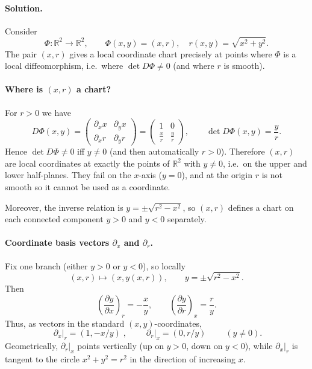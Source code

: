 \documentclass[12pt,a4paper]{article}
\theoremstyle{plain}
\theoremstyle{definition}      %
\begin{document}
\paragraph{\textbf{Solution.}}
Consider
\[
\Phi:\mathbb{R}^2\to \mathbb{R}^2,\qquad \Phi(x,y)=(x,r),\quad r(x,y)=\sqrt{x^2+y^2}.
\]
The pair $(x,r)$ gives a local coordinate chart precisely at points where $\Phi$ is a local diffeomorphism,
i.e.\ where $\det D\Phi\neq 0$ (and where $r$ is smooth).

\paragraph{Where is $(x,r)$ a chart?}
For $r>0$ we have
\[
D\Phi(x,y)=
\begin{pmatrix}
	\partial_x x & \partial_y x\\[2pt]
	\partial_x r & \partial_y r
\end{pmatrix}
=
\begin{pmatrix}
	1 & 0\\[2pt]
	\frac{x}{r} & \frac{y}{r}
\end{pmatrix},
\qquad
\det D\Phi(x,y)=\frac{y}{r}.
\]
Hence $\det D\Phi\neq 0$ iff $y\neq 0$ (and then automatically $r>0$). Therefore $(x,r)$ are local
coordinates at exactly the points of $\mathbb{R}^2$ with $y\neq 0$, i.e.\ on the upper and lower half-planes.
They fail on the $x$-axis ($y=0$), and at the origin $r$ is not smooth so it cannot be used as a coordinate.

Moreover, the inverse relation is $y=\pm\sqrt{r^2-x^2}$, so $(x,r)$ defines a chart on each connected component
$y>0$ and $y<0$ separately.

\paragraph{Coordinate basis vectors $\partial_x$ and $\partial_r$.}
Fix one branch (either $y>0$ or $y<0$), so locally
\[
(x,r)\longmapsto (x,y(x,r)),\qquad y=\pm\sqrt{r^2-x^2}.
\]
Then
\[
\left(\frac{\partial y}{\partial x}\right)_{r}=-\frac{x}{y},
\qquad
\left(\frac{\partial y}{\partial r}\right)_{x}=\frac{r}{y}.
\]
Thus, as vectors in the standard $(x,y)$-coordinates,
\[
\boxed{\;\partial_x\Big|_{r}=(1,-x/y)\;},\qquad
\boxed{\;\partial_r\Big|_{x}=(0,r/y)\;}
\qquad (y\neq 0).
\]
Geometrically, $\partial_r|_x$ points vertically (up on $y>0$, down on $y<0$), while
$\partial_x|_r$ is tangent to the circle $x^2+y^2=r^2$ in the direction of increasing $x$.


\end{document}
